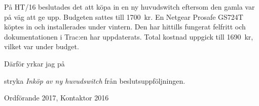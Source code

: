 \documentclass[../_main/handlingar.tex]{subfiles}
\begin{document}

På HT/16 beslutades det att köpa in en ny huvudswitch eftersom den gamla var på väg att ge upp. Budgeten sattes till \SI{1700}{kr}. En Netgear Prosafe GS724T köptes in och installerades under vintern. Den har hittills fungerat felfritt och dokumentationen i Trac:en har uppdaterats. Total kostnad uppgick till \SI{1690}{kr}, vilket var under budget.

Därför yrkar jag på

\begin{attsatser}
    \att stryka \emph{Inköp av ny huvudswitch} från beslutsuppföljningen.
\end{attsatser}

\begin{signatures}{1}
    \mvh
    \signature{Erik Månsson}{Ordförande 2017, Kontaktor 2016}
\end{signatures}
\end{document}
